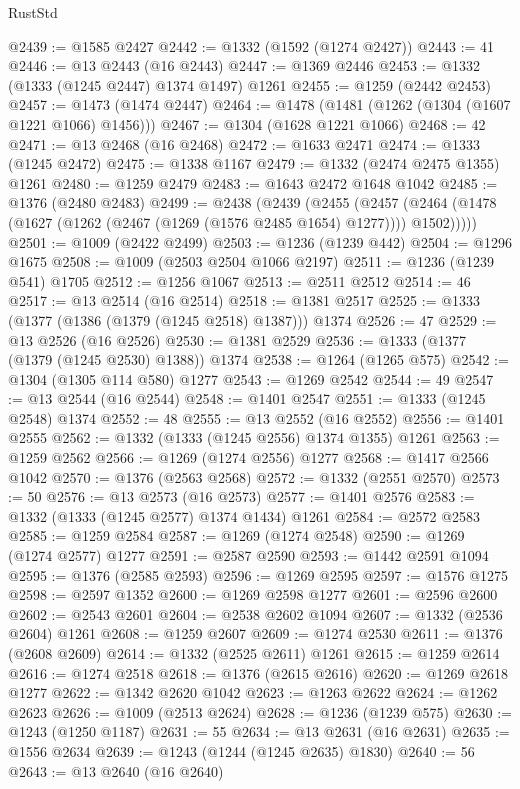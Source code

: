 \begin{lexlean}{RustStd}
\begin{coremodule}
{\begin{coremodule}
{{{{{{{{{{{{{{{{{{{{{{{{{{{{{{{{{{{@2439 := @1585 @2427
@2442 := @1332 (@1592 (@1274 @2427))
@2443 := 41
@2446 := @13 @2443 (@16 @2443)
@2447 := @1369 @2446
@2453 := @1332 (@1333 (@1245 @2447) @1374 @1497) @1261
@2455 := @1259 (@2442 @2453)
@2457 := @1473 (@1474 @2447)
@2464 := @1478 (@1481 (@1262 (@1304 (@1607 @1221 @1066) @1456)))
@2467 := @1304 (@1628 @1221 @1066)
@2468 := 42
@2471 := @13 @2468 (@16 @2468)
@2472 := @1633 @2471
@2474 := @1333 (@1245 @2472)
@2475 := @1338 @1167
@2479 := @1332 (@2474 @2475 @1355) @1261
@2480 := @1259 @2479
@2483 := @1643 @2472 @1648 @1042
@2485 := @1376 (@2480 @2483)
@2499 := @2438
    (@2439
      (@2455
        (@2457 (@2464 (@1478 (@1627 (@1262 (@2467 (@1269 (@1576 @2485 @1654) @1277)))) @1502)))))
@2501 := @1009 (@2422 @2499)
@2503 := @1236 (@1239 @442)
@2504 := @1296 @1675
@2508 := @1009 (@2503 @2504 @1066 @2197)
@2511 := @1236 (@1239 @541) @1705
@2512 := @1256 @1067
@2513 := @2511 @2512
@2514 := 46
@2517 := @13 @2514 (@16 @2514)
@2518 := @1381 @2517
@2525 := @1333 (@1377 (@1386 (@1379 (@1245 @2518) @1387))) @1374
@2526 := 47
@2529 := @13 @2526 (@16 @2526)
@2530 := @1381 @2529
@2536 := @1333 (@1377 (@1379 (@1245 @2530) @1388)) @1374
@2538 := @1264 (@1265 @575)
@2542 := @1304 (@1305 @114 @580) @1277
@2543 := @1269 @2542
@2544 := 49
@2547 := @13 @2544 (@16 @2544)
@2548 := @1401 @2547
@2551 := @1333 (@1245 @2548) @1374
@2552 := 48
@2555 := @13 @2552 (@16 @2552)
@2556 := @1401 @2555
@2562 := @1332 (@1333 (@1245 @2556) @1374 @1355) @1261
@2563 := @1259 @2562
@2566 := @1269 (@1274 @2556) @1277
@2568 := @1417 @2566 @1042
@2570 := @1376 (@2563 @2568)
@2572 := @1332 (@2551 @2570)
@2573 := 50
@2576 := @13 @2573 (@16 @2573)
@2577 := @1401 @2576
@2583 := @1332 (@1333 (@1245 @2577) @1374 @1434) @1261
@2584 := @2572 @2583
@2585 := @1259 @2584
@2587 := @1269 (@1274 @2548)
@2590 := @1269 (@1274 @2577) @1277
@2591 := @2587 @2590
@2593 := @1442 @2591 @1094
@2595 := @1376 (@2585 @2593)
@2596 := @1269 @2595
@2597 := @1576 @1275
@2598 := @2597 @1352
@2600 := @1269 @2598 @1277
@2601 := @2596 @2600
@2602 := @2543 @2601
@2604 := @2538 @2602 @1094
@2607 := @1332 (@2536 @2604) @1261
@2608 := @1259 @2607
@2609 := @1274 @2530
@2611 := @1376 (@2608 @2609)
@2614 := @1332 (@2525 @2611) @1261
@2615 := @1259 @2614
@2616 := @1274 @2518
@2618 := @1376 (@2615 @2616)
@2620 := @1269 @2618 @1277
@2622 := @1342 @2620 @1042
@2623 := @1263 @2622
@2624 := @1262 @2623
@2626 := @1009 (@2513 @2624)
@2628 := @1236 (@1239 @575)
@2630 := @1243 (@1250 @1187)
@2631 := 55
@2634 := @13 @2631 (@16 @2631)
@2635 := @1556 @2634
@2639 := @1243 (@1244 (@1245 @2635) @1830)
@2640 := 56
@2643 := @13 @2640 (@16 @2640)
}}}}}}}}}}}}}}}}}}}}}}}}}}}}}}}}}}}
\end{coremodule}}
\end{coremodule}
\end{lexlean}
